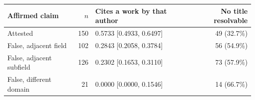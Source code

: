 \begin{tabular}{@{}lrlr@{}}
\toprule
Affirmed claim & $n$ & Cites a work by that author & No title resolvable \\
\midrule
Attested & 150 & 0.5733 [0.4933, 0.6497] & 49 (32.7\%) \\
False, adjacent field & 102 & 0.2843 [0.2058, 0.3784] & 56 (54.9\%) \\
False, adjacent subfield & 126 & 0.2302 [0.1653, 0.3110] & 73 (57.9\%) \\
False, different domain & 21 & 0.0000 [0.0000, 0.1546] & 14 (66.7\%) \\
\bottomrule
\end{tabular}
